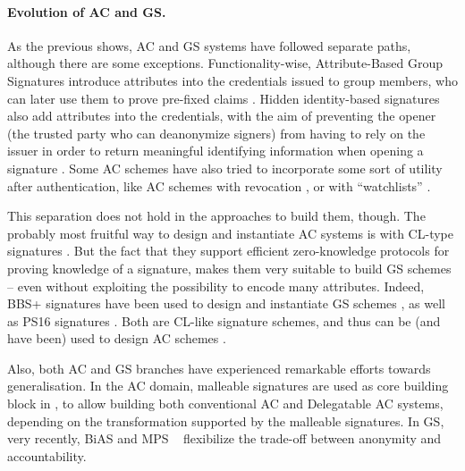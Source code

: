 \paragraph{Evolution of AC and GS.} %
As the previous shows, AC and GS systems have followed separate paths, although
there are some exceptions. Functionality-wise, Attribute-Based Group Signatures
introduce attributes into the credentials issued to group members, who can later
use them to prove pre-fixed claims \cite{emo09,aa14}. Hidden identity-based
signatures also add attributes into the credentials, with the aim of preventing
the opener (the trusted party who can deanonymize signers) from having to rely
on the issuer in order to return meaningful identifying information when opening
a signature \cite{ks07}. Some AC schemes have also tried to incorporate some
sort of utility after authentication, like AC schemes with revocation
\cite{cks10}, or with ``watchlists'' \needcite.

This separation does not hold in the approaches to build them, though. The
probably most fruitful way to design and instantiate AC systems
is with CL-type signatures \cite{cl02}. But the fact that they support efficient
zero-knowledge protocols for proving knowledge of a signature, makes them very
suitable to build GS schemes -- even without exploiting the possibility to
encode many attributes. Indeed, BBS+ signatures \cite{bbs04,cdl16b} have been
used to design and instantiate GS schemes \cite{gl19,dl21}, as well as  PS16
signatures \cite{ps16,cdl+20}. Both are CL-like signature schemes, and thus
can be (and have been) used to design AC schemes \needcite.

Also, both AC and GS branches have experienced remarkable efforts towards
generalisation. In the AC domain, malleable signatures are used as core building
block in \cite{cklm14}, to allow building both conventional AC and Delegatable
AC systems, depending on the transformation supported by the malleable
signatures. In GS, very recently, BiAS \cite{lnpy21} and MPS \needcite~
flexibilize the trade-off between anonymity and accountability.

